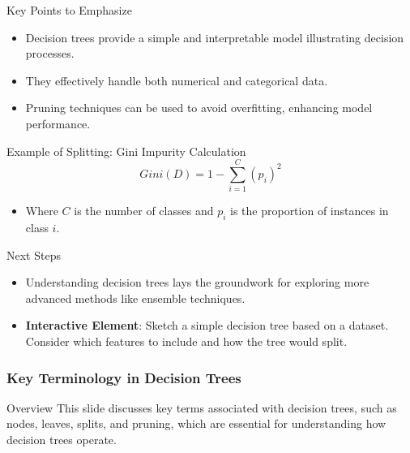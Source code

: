 \documentclass[aspectratio=169]{beamer}
\begin{document}
\begin{frame}[fragile]{Key Points to Emphasize}
  \begin{itemize}
    \item Decision trees provide a simple and interpretable model illustrating decision processes.
    \item They effectively handle both numerical and categorical data.
    \item Pruning techniques can be used to avoid overfitting, enhancing model performance.
  \end{itemize}
\end{frame}

\begin{frame}[fragile]{Example of Splitting: Gini Impurity Calculation}
  \begin{equation}
    Gini(D) = 1 - \sum_{i=1}^{C} (p_i)^2
  \end{equation}
  \begin{itemize}
    \item Where \( C \) is the number of classes and \( p_i \) is the proportion of instances in class \( i \).
  \end{itemize}
\end{frame}

\begin{frame}[fragile]{Next Steps}
  \begin{itemize}
    \item Understanding decision trees lays the groundwork for exploring more advanced methods like ensemble techniques.
    \item \textbf{Interactive Element}: Sketch a simple decision tree based on a dataset. Consider which features to include and how the tree would split.
  \end{itemize}
\end{frame}

\begin{frame}
    \frametitle{Key Terminology in Decision Trees}
    \begin{block}{Overview}
        This slide discusses key terms associated with decision trees, such as nodes, leaves, splits, and pruning, which are essential for understanding how decision trees operate.
    \end{block}
\end{frame}
\end{document}
